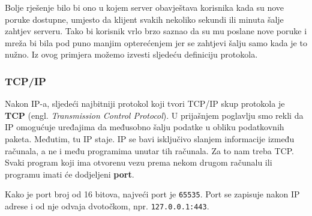 Bolje rješenje bilo bi ono u kojem server obavještava korisnika kada su nove poruke dostupne, umjesto da klijent svakih nekoliko sekundi ili minuta šalje zahtjev serveru.
Tako bi korisnik vrlo brzo saznao da su mu poslane nove poruke i mreža bi bila pod puno manjim opterećenjem jer se zahtjevi šalju samo kada je to nužno.
Iz ovog primjera možemo izvesti sljedeću definiciju protokola.


\subsubsection{TCP/IP}

Nakon IP-a, sljedeći najbitniji protokol koji tvori TCP/IP skup protokola je \textbf{TCP} (engl. \textit{Transmission Control Protocol}).
U prijašnjem poglavlju smo rekli da IP omogućuje uređajima da međusobno šalju podatke u obliku podatkovnih paketa.
Međutim, tu IP staje.
IP se bavi isključivo slanjem informacije između računala, a ne i među programima unutar tih računala.
Za to nam treba TCP.
Svaki program koji ima otvorenu vezu prema nekom drugom računalu ili programu imati će dodjeljeni \textbf{port}.


Kako je port broj od 16 bitova, najveći port je \verb|65535|.
Port se zapisuje nakon IP adrese i od nje odvaja dvotočkom, npr. \verb|127.0.0.1:443|.

